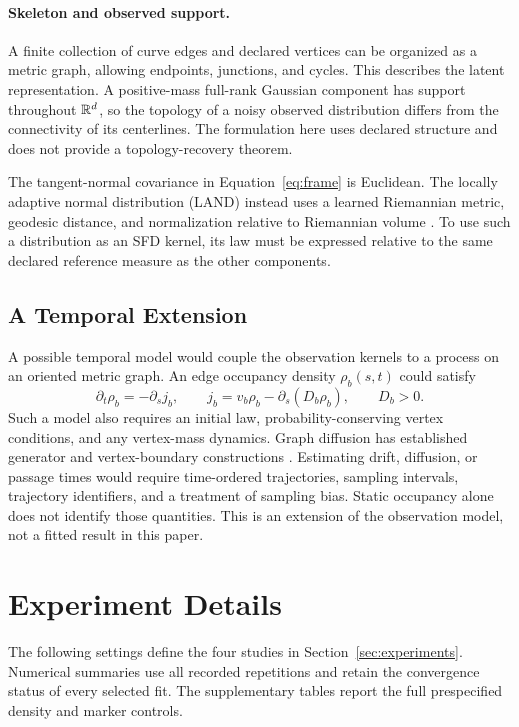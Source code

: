 \paragraph{Skeleton and observed support.}
A finite collection of curve edges and declared vertices can be organized
as a metric graph, allowing endpoints, junctions, and cycles. This describes
the latent representation. A positive-mass full-rank Gaussian component has
support throughout $\mathbb R^d$, so the topology of a noisy observed distribution
differs from the connectivity of its centerlines. The formulation here uses
declared structure and does not provide a topology-recovery theorem.

The tangent-normal covariance in Equation~\ref{eq:frame} is Euclidean.
The locally adaptive normal distribution (LAND) instead uses a learned
Riemannian metric, geodesic distance, and normalization relative to
Riemannian volume \citep{arvanitidis2016land}. To use such a distribution
as an SFD kernel, its law must be expressed relative to the same declared
reference measure as the other components.


\FloatBarrier

\subsection{A Temporal Extension}
A possible temporal model would couple the observation kernels to a process
on an oriented metric graph. An edge occupancy density $\rho_b(s,t)$ could
satisfy
\[
 \partial_t\rho_b=-\partial_s j_b,\qquad
 j_b=v_b\rho_b-\partial_s(D_b\rho_b),\qquad D_b>0.
\]
Such a model also requires an initial law, probability-conserving vertex
conditions, and any vertex-mass dynamics. Graph diffusion has established
generator and vertex-boundary constructions \citep{kostrykin2012brownian}.
Estimating drift, diffusion, or passage times would require time-ordered
trajectories, sampling intervals, trajectory identifiers, and a treatment of
sampling bias. Static occupancy alone does not identify those quantities.
This is an extension of the observation model, not a fitted result in this paper.

\FloatBarrier








\section{Experiment Details}
\label{app:experiments}
The following settings define the four studies in Section~\ref{sec:experiments}.
Numerical summaries use all recorded repetitions and retain the convergence
status of every selected fit. The supplementary tables report the full
prespecified density and marker controls.


